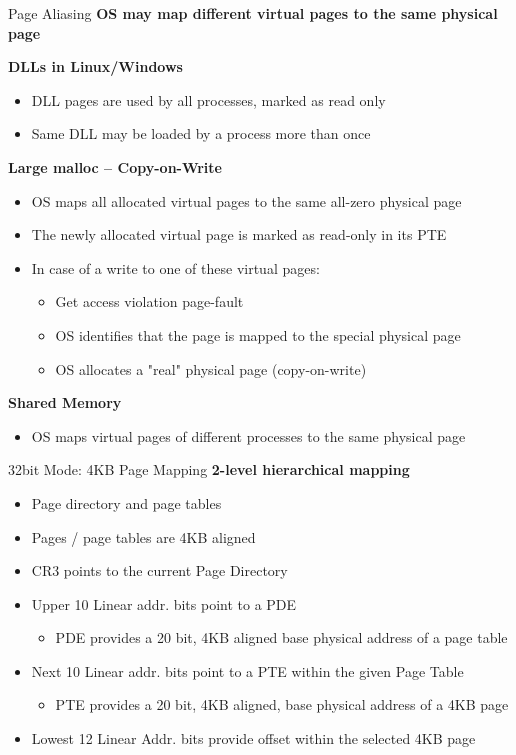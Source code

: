 \documentclass[aspectratio=169,12pt]{beamer}
\begin{document}
\begin{frame}{Page Aliasing}
\textbf{OS may map different virtual pages to the same physical page}

\textbf{DLLs in Linux/Windows}
\begin{itemize}
\item DLL pages are used by all processes, marked as read only
\item Same DLL may be loaded by a process more than once
\end{itemize}

\textbf{Large malloc – Copy-on-Write}
\begin{itemize}
\item OS maps all allocated virtual pages to the same all-zero physical page
\item The newly allocated virtual page is marked as read-only in its PTE
\item In case of a write to one of these virtual pages:
    \begin{itemize}
    \item Get access violation page-fault
    \item OS identifies that the page is mapped to the special physical page
    \item OS allocates a "real" physical page (copy-on-write)
    \end{itemize}
\end{itemize}

\textbf{Shared Memory}
\begin{itemize}
\item OS maps virtual pages of different processes to the same physical page
\end{itemize}
\end{frame}

\begin{frame}{32bit Mode: 4KB Page Mapping}
\textbf{2-level hierarchical mapping}
\begin{itemize}
\item Page directory and page tables
\item Pages / page tables are 4KB aligned
\end{itemize}

\begin{itemize}
\item CR3 points to the current Page Directory
\item Upper 10 Linear addr. bits point to a PDE
    \begin{itemize}
    \item PDE provides a 20 bit, 4KB aligned base physical address of a page table
    \end{itemize}
\item Next 10 Linear addr. bits point to a PTE within the given Page Table
    \begin{itemize}
    \item PTE provides a 20 bit, 4KB aligned, base physical address of a 4KB page
    \end{itemize}
\item Lowest 12 Linear Addr. bits provide offset within the selected 4KB page
\end{itemize}
\end{frame}
\end{document}
